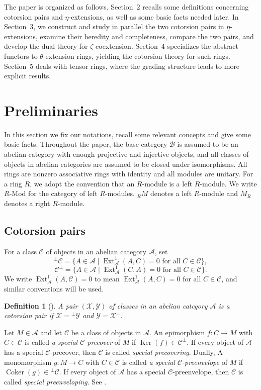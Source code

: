 \documentclass[11pt,reqno]{amsart}
\numberwithin{equation}{section}
\newtheorem{definition}[theorem]{Definition}
\newcommand{\cA}{\mathcal A}
\newcommand{\cB}{\mathcal B}
\newcommand{\cX}{\mathcal X}
\newcommand{\cY}{\mathcal Y}
\newcommand{\cC}{\mathcal C}
\newcommand{\Ext}{\operatorname{Ext}}
\newcommand{\Coker}{\operatorname{Coker}}
\newcommand{\Ker}{\operatorname{Ker}}
\begin{document}
The paper is organized as follows. Section~2 recalls some definitions concerning cotorsion pairs and
$\eta$-extensions, as well as some basic facts needed later. In Section~3, we construct and study in parallel the two cotorsion pairs in
$\eta$-extensions, examine their heredity and completeness, compare the two pairs, and develop the dual theory for $\zeta$-coextension.
Section~4 specializes the abstract functors to
$\theta$-extension rings, yielding the cotorsion theory for such rings. Section~5 deals with tensor rings, where the grading structure leads to more explicit results.

\section{Preliminaries}\label{section:pre}

In this section we fix our notations, recall some relevant concepts and give some basic facts. Throughout the paper, the base category $\cB$ is assumed to be an abelian category with enough projective and injective objects, and all classes of objects in abelian categories are assumed to be closed under isomorphisms. All rings are nonzero associative rings with identity and all modules are unitary. For a ring $R$, we adopt the convention that an $R$-module is a left $R$-module. We write $R$-Mod for the category of left $R$-modules.
${}_RM$ denotes a left $R$-module and $M_R$ denotes a right $R$-module.

\subsection{Cotorsion pairs} For a class $\cC$ of objects in an abelian category $\cA$, set
\[
{}^\perp\cC
 =\{A\in\cA\mid \Ext^1_{\cA}(A,C)=0\text{ for all }C\in\cC\},
\]
\[
\cC^\perp
 =\{A\in\cA\mid \Ext^1_{\cA}(C,A)=0\text{ for all }C\in\cC\}.
\]
We write $\Ext^1_{\cA}(A,\cC)=0$ to mean $\Ext^1_{\cA}(A,C)=0\text{ for all }C\in\cC$, and similar conventions will be used.

\begin{definition}[\cite{Salce}]
A pair $(\cX,\cY)$ of classes in an abelian category $\cA$ is a \emph{cotorsion pair} if
$
\cX={}^\perp\cY
$
and
$
\cY=\cX^\perp.
$
\end{definition}

Let $M\in \cA$ and let $\cC$ be a class of objects in $\cA$. An epimorphism $f: C \rightarrow M$ with $C\in \cC$ is called \emph{a special $\cC$-precover}
 of $M$ if $\Ker(f)\in \cC^\perp$.
If every object of $\cA$
has a special $\cC$-precover, then $\cC$ is called \emph{special precovering}. Dually, A monomorphism $g: M\rightarrow C$ with $C\in \cC$
 is called \emph{a special $\cC$-preenvelope} of  $M$ if $\Coker(g)\in {}^\perp\cC$. If every object of $\cA$
has a special $\cC$-preenvelope, then $\cC$ is called \emph{special preenveloping}. See \cite[Definition 2.1.12]{GobelTrlifaj}.
\end{document}
